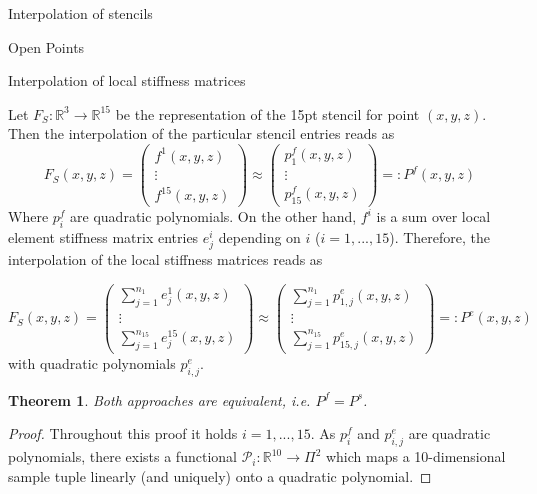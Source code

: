 \documentclass[a4paper,11pt,reqno]{amsart}
\numberwithin{figure}{section}
\numberwithin{table}{section}
\numberwithin{figure}{subsection}
\def\RR{\mathbb{R}}
\def\P{\mathcal{P}}
\newtheorem{theorem}{Theorem}
\begin{document}
\begin{section}{Interpolation of stencils}
\begin{subsection}{Open Points}


\end{subsection}

\end{section}


\newpage
\begin{section}{Interpolation of local stiffness matrices}

Let $F_S : \RR^3 \rightarrow \RR^{15}$ be the representation of the 15pt stencil
for point $(x,y,z)$. Then the interpolation of the particular stencil entries reads
as
\begin{equation}
\label{eq:interpolationStencil}
F_S(x,y,z) = 
\begin{pmatrix}
f^1(x,y,z) \\
\vdots \\
f^{15}(x,y,z)
\end{pmatrix}
\approx
\begin{pmatrix}
p^f_1(x,y,z) \\
\vdots \\
p^f_{15}(x,y,z)
\end{pmatrix}
=: P^f(x,y,z)
\end{equation}
Where $p^f_i$ are quadratic polynomials.
On the other hand, $f^i$ is a sum over local element stiffness matrix entries 
$e_j^i$ depending on $i$ ($i = 1,...,15$). 
Therefore, the interpolation of the local stiffness matrices reads as

\begin{equation}
\label{eq:interpolationLocStiffness}
F_S(x,y,z) = 
\begin{pmatrix}
\sum_{j=1}^{n_1}e_j^1(x,y,z) \\
\vdots \\
\sum_{j=1}^{n_{15}}e_j^{15}(x,y,z) 
\end{pmatrix}
\approx
\begin{pmatrix}
\sum_{j=1}^{n_1}p_{1,j}^e(x,y,z)  \\
\vdots \\
\sum_{j=1}^{n_{15}}p_{15,j}^e(x,y,z) 
\end{pmatrix}
=: P^e(x,y,z)
\end{equation}
with quadratic polynomials $p^e_{i,j}$.

\begin{theorem}
Both approaches are equivalent, i.e. $P^f = P^s$.
\end{theorem}
\begin{proof}
Throughout this proof it holds $i = 1,...,15$.
As $p^f_i$ and $p^e_{i,j}$ are quadratic polynomials, there exists 
a functional $\P_i : \RR^{10} \rightarrow \Pi^2$ which maps a
10-dimensional sample tuple linearly (and uniquely) 
onto a quadratic polynomial.


\end{proof}
\end{section}
\end{document}
